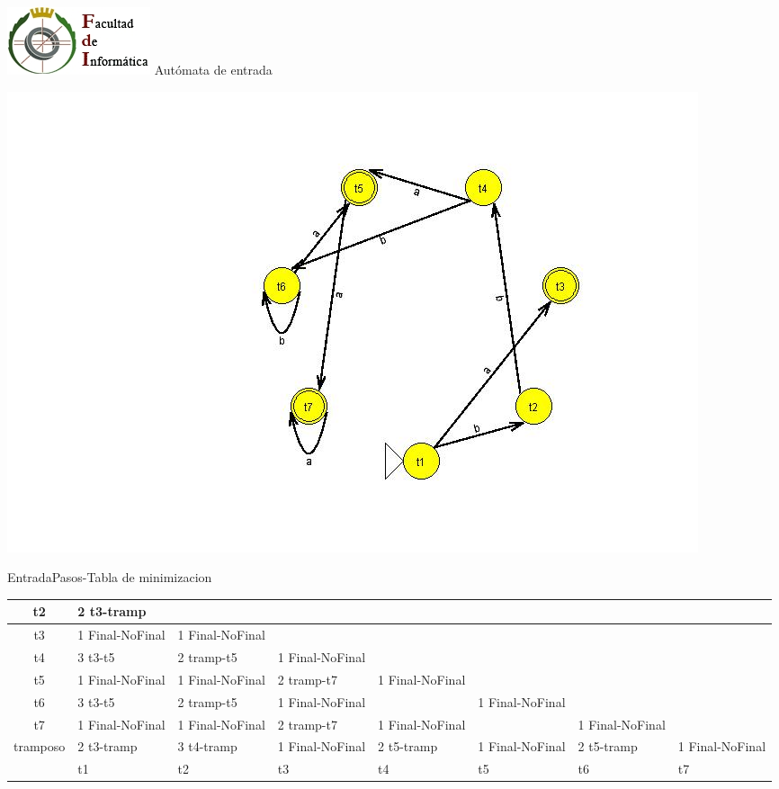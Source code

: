 \documentclass[a4paper,11pt]{article}
\newcommand{\MYp}[1]{ {\color[rgb]{0.392,0.392,0.392}#1} }
\begin{document}
\includegraphics{fdi.jpg}
\newline
\newline
\newline
\MYp{\Huge Aut\'{o}mata de entrada}
\begin{center}
\includegraphics[width=\textwidth]{imagenEntrada.jpg}
\end{center}
EntradaPasos-Tabla de minimizacion
\noindent\begin{center}
 \begin{tabular}{||c||m{1.2cm}||m{1.2cm}||m{1.2cm}||m{1.2cm}||m{1.2cm}||m{1.2cm}||m{1.2cm}||}\hline
t2 &2 t3-tramp& & & & & & \\ \hline 
t3 &1 Final-NoFinal&1 Final-NoFinal& & & & & \\ \hline 
t4 &3 t3-t5&2 tramp-t5&1 Final-NoFinal& & & & \\ \hline 
t5 &1 Final-NoFinal&1 Final-NoFinal&2 tramp-t7&1 Final-NoFinal& & & \\ \hline 
t6 &3 t3-t5&2 tramp-t5&1 Final-NoFinal& &1 Final-NoFinal& & \\ \hline 
t7 &1 Final-NoFinal&1 Final-NoFinal&2 tramp-t7&1 Final-NoFinal& &1 Final-NoFinal& \\ \hline 
tramposo &2 t3-tramp&3 t4-tramp&1 Final-NoFinal&2 t5-tramp&1 Final-NoFinal&2 t5-tramp&1 Final-NoFinal\\ \hline 
 & t1&t2&t3&t4&t5&t6&t7\\ \hline


\end{tabular}
\end{center}
\end{document}
